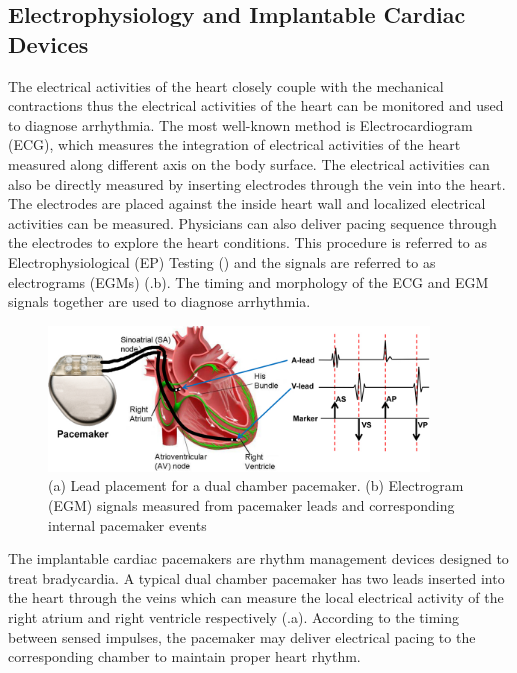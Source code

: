 \subsection{Electrophysiology and Implantable Cardiac Devices}
\label{EP}
The electrical activities of the heart closely couple with the mechanical contractions thus the electrical activities of the heart can be monitored and used to diagnose arrhythmia. The most well-known method is Electrocardiogram (ECG), which measures the integration of electrical activities of the heart measured along different axis on the body surface. The electrical activities can also be directly measured by inserting electrodes through the vein into the heart. The electrodes are placed against the inside heart wall and localized electrical activities can be measured. Physicians can also deliver pacing sequence through the electrodes to explore the heart conditions. This procedure is referred to as Electrophysiological (EP) Testing  (\cite{josephson}) and the signals are referred to as electrograms (EGMs) (.b). The timing and morphology of the  ECG and EGM signals together are used to diagnose arrhythmia.
\begin{figure}[!t]
\centering
		\includegraphics[width=0.9\textwidth]{figs/egm.pdf}
		
\caption{\small (a) Lead placement for a dual chamber pacemaker. (b) Electrogram (EGM) signals measured from pacemaker leads and corresponding internal pacemaker events}
\label{fig:probes}
\end{figure} 

The implantable cardiac pacemakers are rhythm management devices designed to treat bradycardia. A typical dual chamber pacemaker has two leads inserted into the heart through the veins which can measure the local electrical activity of the right atrium and right ventricle respectively (.a). According to the timing between sensed impulses, the pacemaker may deliver electrical pacing to the corresponding chamber to maintain proper heart rhythm.

